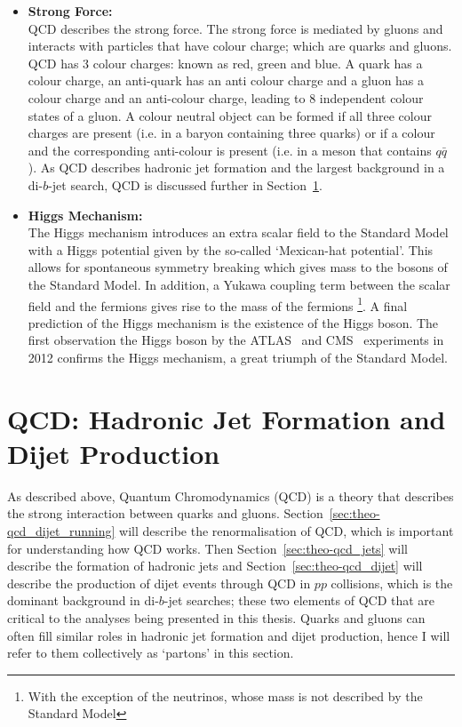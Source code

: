\begin{itemize}[leftmargin=*]
\item\textbf{Strong Force:}\\
  QCD describes the strong force.
  The strong force is mediated by gluons 
  and interacts with particles that have colour charge; which are quarks and gluons.
  QCD has 3 colour charges: known as red, green and blue.
  A quark has a colour charge, an anti-quark has an anti colour charge and 
  a gluon has a colour charge and an anti-colour charge, leading to 8 independent colour states of a gluon.
  A colour neutral object can be formed if all three colour charges are present (i.e. in a baryon containing three quarks)
  or if a colour and the corresponding anti-colour is present (i.e. in a meson that contains $q\bar{q}$).
  As QCD describes hadronic jet formation and the largest background in a di-$b$-jet search, QCD is discussed further in Section~\ref{sec:theo-qcd}.\vspace{1em}

\item\textbf{Higgs Mechanism:}\\
  The Higgs mechanism introduces an extra scalar field to the Standard Model
  with a Higgs potential given by the so-called `Mexican-hat potential'.
  This allows for spontaneous symmetry breaking which gives mass to the bosons of the Standard Model.
  In addition, a Yukawa coupling term between the scalar field and the fermions gives rise to the mass of the fermions
  \footnote{With the exception of the neutrinos, whose mass is not described by the Standard Model}.
  A final prediction of the Higgs mechanism is the existence of the Higgs boson.
  The first observation the Higgs boson by the ATLAS~\cite{theo-higgs_atlas} and CMS~\cite{theo-higgs_cms} experiments
  in 2012 confirms the Higgs mechanism, a great triumph of the Standard Model.
\end{itemize}

\section{QCD: Hadronic Jet Formation and Dijet Production}
\label{sec:theo-qcd}

As described above, Quantum Chromodynamics (QCD) is a theory that describes the strong interaction between quarks and gluons.
Section~\ref{sec:theo-qcd_dijet_running} will describe the renormalisation of QCD, which is important for understanding how QCD works.
Then Section~\ref{sec:theo-qcd_jets} will describe the formation of hadronic jets and
Section~\ref{sec:theo-qcd_dijet} will describe the production of dijet events through QCD in $pp$ collisions, which is the dominant background in di-$b$-jet searches;
these two elements of QCD that are critical to the analyses being presented in this thesis.
Quarks and gluons can often fill similar roles in hadronic jet formation and dijet production, hence I will refer to them collectively as `partons' in this section.

